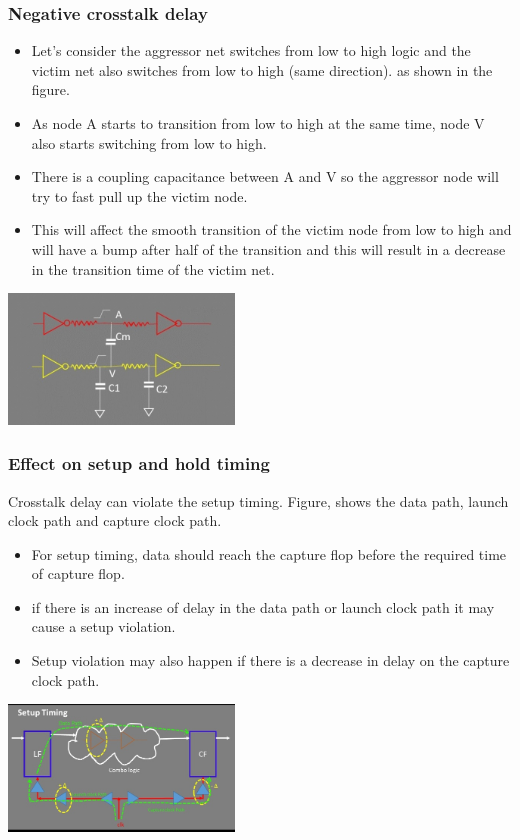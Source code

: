 \documentclass{beamer}
\begin{document}
	\begin{frame}
	\frametitle{Negative crosstalk delay}
	\begin{itemize}
		\item Let’s consider the aggressor net switches from low to high logic and the victim net also switches from low to high (same direction). as shown in the figure.
		\item As node A starts to transition from low to high at the same time, node V also starts switching from low to high. 
		\item There is a coupling capacitance between A and V so the aggressor node will try to fast pull up the victim node. 
		\item This will affect the smooth transition of the victim node from low to high and will have a bump after half of the transition and this will result in a decrease in the transition time of the victim net. 
	\end{itemize}
	\begin{center}
		\includegraphics[width=0.45\textwidth]{crosstalkDelay2}
	\end{center}
\end{frame}
\begin{frame}
	\frametitle{Effect on setup and hold timing}
	Crosstalk delay can violate the setup timing. Figure, shows the data path, launch clock path and capture clock path. 
	\begin{itemize}
		\item For setup timing, data should reach the capture flop before the required time of capture flop.
		\item if there is an increase of delay in the data path or launch clock path it may cause a setup violation.
		\item Setup violation may also happen if there is a decrease in delay on the capture clock path.  
	\end{itemize}
		\begin{center}
		\includegraphics[width=0.45\textwidth]{setup}
	\end{center}
\end{frame}	
\end{document}
